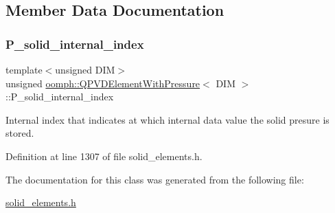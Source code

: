 \subsection{Member Data Documentation}
\mbox{\label{classoomph_1_1QPVDElementWithPressure_aee9e009b78d9891746c23bd031b39a1c}} 
\subsubsection{\texorpdfstring{P\+\_\+solid\+\_\+internal\+\_\+index}{P\_solid\_internal\_index}}
{\footnotesize\ttfamily template$<$unsigned D\+IM$>$ \\
unsigned \hyperlink{classoomph_1_1QPVDElementWithPressure}{oomph\+::\+Q\+P\+V\+D\+Element\+With\+Pressure}$<$ D\+IM $>$\+::P\+\_\+solid\+\_\+internal\+\_\+index\hspace{0.3cm}{\ttfamily [protected]}}



Internal index that indicates at which internal data value the solid presure is stored. 



Definition at line 1307 of file solid\+\_\+elements.\+h.



The documentation for this class was generated from the following file\+:\begin{DoxyCompactItemize}
\item 
\hyperlink{solid__elements_8h}{solid\+\_\+elements.\+h}\end{DoxyCompactItemize}
